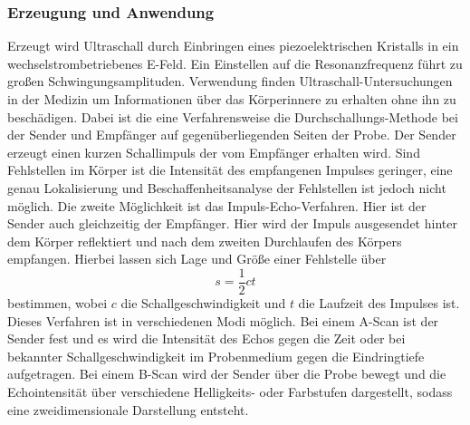 \subsubsection{Erzeugung und Anwendung}
Erzeugt wird Ultraschall durch Einbringen eines piezoelektrischen Kristalls in ein wechselstrombetriebenes E-Feld. Ein Einstellen auf die Resonanzfrequenz führt zu großen Schwingungsamplituden.\newline
Verwendung finden Ultraschall-Untersuchungen in der Medizin um Informationen über das Körperinnere zu erhalten ohne ihn zu beschädigen.\newline
Dabei ist die eine Verfahrensweise die Durchschallungs-Methode bei der Sender und Empfänger auf gegenüberliegenden Seiten der Probe. Der Sender erzeugt einen kurzen Schallimpuls der vom Empfänger erhalten wird. Sind Fehlstellen im Körper ist die Intensität des empfangenen Impulses geringer, eine genau Lokalisierung und Beschaffenheitsanalyse der Fehlstellen ist jedoch nicht möglich.\newline
Die zweite Möglichkeit ist das Impuls-Echo-Verfahren.
Hier ist der Sender auch gleichzeitig der Empfänger. Hier wird der Impuls ausgesendet hinter dem Körper reflektiert und nach dem zweiten Durchlaufen des Körpers empfangen.
Hierbei lassen sich Lage und Größe einer Fehlstelle über 
\begin{equation}
s=\frac{1}{2}c t
\end{equation}
bestimmen, wobei $c$ die Schallgeschwindigkeit und $t$ die Laufzeit des Impulses ist. Dieses Verfahren ist in verschiedenen Modi möglich.
Bei einem A-Scan ist der Sender fest und es wird die Intensität des Echos gegen die Zeit oder bei bekannter Schallgeschwindigkeit im Probenmedium gegen die Eindringtiefe aufgetragen.
Bei einem B-Scan wird der Sender über die Probe bewegt und die Echointensität über verschiedene Helligkeits- oder Farbstufen dargestellt, sodass eine zweidimensionale Darstellung entsteht.
